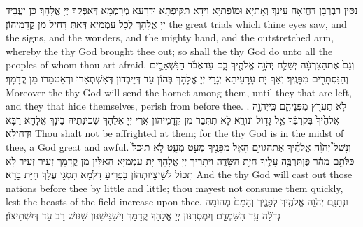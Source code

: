{נִסִּין רַבְרְבָן דַּחֲזָאָה עֵינָךְ וְאָתַיָּא וּמוֹפְתַיָּא וִידָא תַּקִּיפְתָא וּדְרָעָא מְרָמְמָא דְּאַפְּקָךְ יְיָ אֱלָהָךְ כֵּן יַעֲבֵיד יְיָ אֱלָהָךְ לְכָל עַמְמַיָּא דְּאַתְּ דָּחֵיל מִן קֳדָמֵיהוֹן׃}
{the great trials which thine eyes saw, and the signs, and the wonders, and the mighty hand, and the outstretched arm, whereby the \lord\space thy God brought thee out; so shall the \lord\space thy God do unto all the peoples of whom thou art afraid.}{}
{וְגַם֙ אֶת\maqqaf הַצִּרְעָ֔ה יְשַׁלַּ֛ח יְהֹוָ֥ה אֱלֹהֶ֖יךָ בָּ֑ם עַד\maqqaf אֲבֹ֗ד הַנִּשְׁאָרִ֛ים וְהַנִּסְתָּרִ֖ים מִפָּנֶֽיךָ׃}
{וְאַף יָת עָרָעִיתָא יְגָרֵי יְיָ אֱלָהָךְ בְּהוֹן עַד דְּיֵיבְדוּן דְּאִשְׁתְּאַרוּ וּדְאִטְּמַרוּ מִן קֳדָמָךְ׃}
{Moreover the \lord\space thy God will send the hornet among them, until they that are left, and they that hide themselves, perish from before thee. .}{}
{לֹ֥א תַעֲרֹ֖ץ מִפְּנֵיהֶ֑ם כִּֽי\maqqaf יְהֹוָ֤ה אֱלֹהֶ֙יךָ֙ בְּקִרְבֶּ֔ךָ אֵ֥ל גָּד֖וֹל וְנוֹרָֽא׃}
{לָא תִתְּבַר מִן קֳדָמֵיהוֹן אֲרֵי יְיָ אֱלָהָךְ שְׁכִינְתֵיהּ בֵּינָךְ אֱלָהָא רַבָּא וּדְחִילָא׃}
{Thou shalt not be affrighted at them; for the \lord\space thy God is in the midst of thee, a God great and awful.}{}
{וְנָשַׁל֩ יְהֹוָ֨ה אֱלֹהֶ֜יךָ אֶת\maqqaf הַגּוֹיִ֥ם הָאֵ֛ל מִפָּנֶ֖יךָ מְעַ֣ט מְעָ֑ט לֹ֤א תוּכַל֙ כַּלֹּתָ֣ם מַהֵ֔ר פֶּן\maqqaf תִּרְבֶּ֥ה עָלֶ֖יךָ חַיַּ֥ת הַשָּׂדֶֽה׃}
{וִיתָרֵיךְ יְיָ אֱלָהָךְ יָת עַמְמַיָּא הָאִלֵּין מִן קֳדָמָךְ זְעֵיר זְעֵיר לָא תִכּוֹל לְשֵׁיצָיוּתְהוֹן בִּפְרִיעַ דִּלְמָא תִסְגֵּי עֲלָךְ חַיַּת בָּרָא׃}
{And the \lord\space thy God will cast out those nations before thee by little and little; thou mayest not consume them quickly, lest the beasts of the field increase upon thee.}{}
{וּנְתָנָ֛ם יְהֹוָ֥ה אֱלֹהֶ֖יךָ לְפָנֶ֑יךָ וְהָמָם֙ מְהוּמָ֣ה גְדֹלָ֔ה עַ֖ד הִשָּׁמְדָֽם׃}
{וְיִמְסְרִנּוּן יְיָ אֱלָהָךְ קֳדָמָךְ וִישַׁגֵּישִׁנּוּן שִׁגּוּשׁ רַב עַד דְּיִשְׁתֵּיצוֹן׃}
